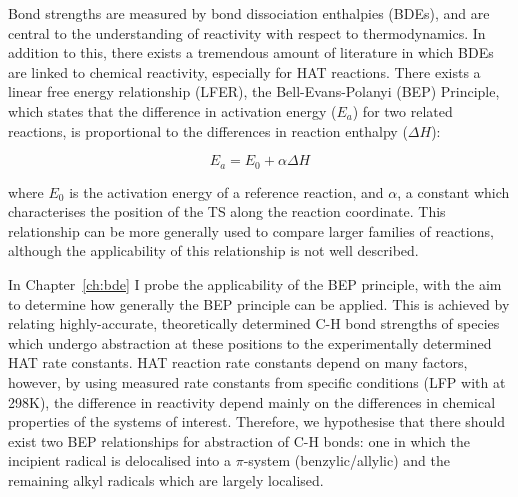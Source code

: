 Bond strengths are measured by bond dissociation enthalpies (BDEs), and are central to the understanding of reactivity with respect to thermodynamics. In addition to this, there exists a tremendous amount of literature in which BDEs are linked to chemical reactivity, especially for HAT reactions.\cite{Kochi1973,Tedder1982,Wijtmans2003,Pratt2004,Mayer2004} There exists a linear free energy relationship (LFER), the Bell-Evans-Polanyi (BEP) Principle,\cite{Bell1936,Evans1938} which states that the difference in activation energy ($E_a$) for two related reactions, is proportional to the differences in reaction enthalpy ($\Delta H$):

\begin{equation}
  E_a = E_0 + \alpha \Delta H
  \label{eq:bep}
\end{equation}

\noindent where $E_0$ is the activation energy of a reference reaction, and $\alpha$, a constant which characterises the position of the TS along the reaction coordinate. This relationship can be more generally used to compare larger families of reactions, although the applicability of this relationship is not well described.

In Chapter~\ref{ch:bde} I probe the applicability of the BEP principle, with the aim to determine how generally the BEP principle can be applied. This is achieved by relating highly-accurate, theoretically determined C-H bond strengths of species which undergo abstraction at these positions to the experimentally determined HAT rate constants. HAT reaction rate constants depend on many factors, however, by using measured rate constants from specific conditions (LFP with \cumo at 298K), the difference in reactivity depend mainly on the differences in chemical properties of the systems of interest. Therefore, we hypothesise that there should exist two BEP relationships for abstraction of C-H bonds: one in which the incipient radical is delocalised into a $\pi$-system (benzylic/allylic) and the remaining alkyl radicals which are largely localised.

